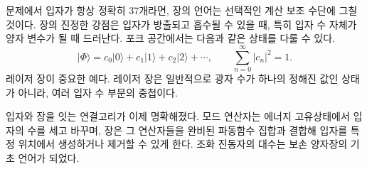 문제에서 입자가 항상 정확히 37개라면, 장의 언어는 선택적인 계산 보조 수단에 그칠 것이다. 장의 진정한 강점은 입자가 방출되고 흡수될 수 있을 때, 특히 입자 수 자체가 양자 변수가 될 때 드러난다. 포크 공간에서는 다음과 같은 상태를 다룰 수 있다.
\begin{equation}
|\Phi\rangle
=c_0|0\rangle+c_1|1\rangle+c_2|2\rangle+\cdots,
\qquad
\sum_{n=0}^{\infty}|c_n|^2=1.
\end{equation}
레이저 장이 중요한 예다. 레이저 장은 일반적으로 광자 수가 하나의 정해진 값인 상태가 아니라, 여러 입자 수 부문의 중첩이다.

입자와 장을 잇는 연결고리가 이제 명확해졌다. 모드 연산자는 에너지 고유상태에서 입자의 수를 세고 바꾸며, 장은 그 연산자들을 완비된 파동함수 집합과 결합해 입자를 특정 위치에서 생성하거나 제거할 수 있게 한다. 조화 진동자의 대수는 보손 양자장의 기초 언어가 되었다.
